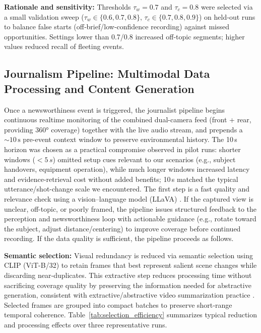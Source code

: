 \documentclass[letterpaper, 10 pt, conference]{ieeeconf}  %
\begin{document}
\textbf{Rationale and sensitivity:} Thresholds $\tau_w{=}0.7$ and $\tau_c{=}0.8$ were selected via a small validation sweep ($\tau_w\in\{0.6,0.7,0.8\},\,\tau_c\in\{0.7,0.8,0.9\}$) on held‑out runs to balance false starts (off‑brief/low‑confidence recording) against missed opportunities. Settings lower than 0.7/0.8 increased off‑topic segments; higher values reduced recall of fleeting events.

\subsection{Journalism Pipeline: Multimodal Data Processing and Content Generation}
Once a newsworthi\-ness event is triggered, the journalist pipeline begins continuous real\-time monitoring of the combined dual-camera feed (front + rear, providing 360° coverage) together with the live audio stream, and prepends a \(\sim\!10\,\text{s}\) pre-event context window to preserve environmental history. The 10\,s horizon was chosen as a practical compromise observed in pilot runs: shorter windows ($<5\,s$) omitted setup cues relevant to our scenarios (e.g., subject handovers, equipment operation), while much longer windows increased latency and evidence-retrieval cost without added benefits; 10\,s matched the typical utterance/shot-change scale we encountered. The first step is a fast quality and relevance check using a vision–language model (LLaVA) \cite{liu2023llava, li2024llava}. If the captured view is unclear, off-topic, or poorly framed, the pipeline issues structured feedback to the perception and newsworthi\-ness loop with actionable guidance (e.g., rotate toward the subject, adjust distance/centering) to improve coverage before continued recording. If the data quality is sufficient, the pipeline proceeds as follows.

\textbf{Semantic selection:} Visual redundancy is reduced via semantic selection using CLIP (ViT-B/32) \cite{radford2021clip} to retain frames that best represent salient scene changes while discarding near‑duplicates. This extractive step reduces processing time without sacrificing coverage quality by preserving the information needed for abstractive generation, consistent with extractive/abstractive video summarization practice \cite{video_summarization_2024}. Selected frames are grouped into compact batches to preserve short‑range temporal coherence. Table~\ref{tab:selection_efficiency} summarizes typical reduction and processing effects over three representative runs.
\end{document}
